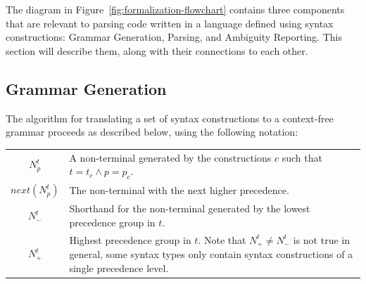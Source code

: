 \documentclass{kththesis}
\begin{document}
The diagram in Figure~\ref{fig:formalization-flowchart} contains three components that are relevant to parsing code written in a language defined using syntax constructions: Grammar Generation, Parsing, and Ambiguity Reporting. This section will describe them, along with their connections to each other.

\subsection{Grammar Generation} \label{sec:formalization-grammar-generation}

The algorithm for translating a set of syntax constructions to a context-free grammar proceeds as described below, using the following notation:

\mathligsoff
{\tabulinesep=2mm
\begin{tabu}{c|p{10cm}}
$N^t_p$ & A non-terminal generated by the constructions $c$ such that $t = t_c \land p = p_c$. \\
$next(N^t_p)$ & The non-terminal with the next higher precedence. \\
$N^t_-$ & Shorthand for the non-terminal generated by the lowest precedence group in $t$. \\
$N^t_+$ & Highest precedence group in $t$. Note that $N^t_+ \neq N^t_-$ is not true in general, some syntax types only contain syntax constructions of a single precedence level. \\
\end{tabu}
}
\end{document}
